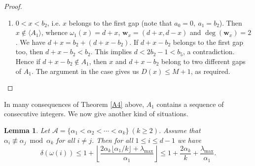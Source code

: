 \documentclass[11pt]{article}
\newtheorem{Lemma}[Theorem]{Lemma}
\def\deg{\operatorname{deg}}
\def\wbf{{\mathbf w}}
\def\Acal{{\mathcal A}}
\theoremstyle{remark}
\theoremstyle{definition}
\begin{document}
\begin{proof}
\begin{enumerate}
\begin{enumerate}[\((\text{b}1)\)]
   $$\delta_1(\wbf_x) = \delta_1(x) \leq  2+ \left\lfloor \frac{x-b}{b_2} \right\rfloor \leq  2+ \left\lfloor \frac{x-b_3-1}{b_2} \right\rfloor \leq 2+ \left\lfloor \frac{x-b_3-1}{\epsilon'} \right\rfloor.$$
   This implies
   $$D(x) \leq   \left\lceil \frac{b_4 - x}{\epsilon'} \right\rceil + \left\lfloor \frac{x-b_3 -1}{\epsilon'} \right\rfloor \leq  \left\lceil \frac{b_4-b_3 -1}{\epsilon'} \right\rceil = \left\lfloor \frac{\lambda_i}{\epsilon'} \right\rfloor \le M.$$
     \end{enumerate}
     \item $0< x< b_2$, i.e. $x$ belongs to the first gap (note that $a_0 = 0, \ a_1 = b_2$). Then $x\not\in \langle A_1\rangle$, whence $\omega_1(x) =d+x$, $\wbf_x = (d+x, d-x)$ and $\deg(\wbf_x) = 2$. We have $d+ x = b_2 + (d+x-b_2)$. If $d+x-b_2$ belongs to the first gap too, then $d+x-b_2 < b_2$. This implies $d< 2b_2 - 1< b_5$, a contradiction. Hence if $d+x-b_2\not\in A_1$, then $x$ and $d+x-b_2$ belong to two different gaps of $A_1$. The argument in the case  gives us $D(x)\leq M + 1$, as required. 
 \end{enumerate}
\end{proof}

In many consequences of Theorem \ref{A4} above, $A_1$ contains a sequence of consecutive integers. We now give another kind of situations.

\begin{Lemma} \label{A7} Let $\Acal =\{ \alpha_1< \alpha_2 < \cdots < \alpha_k\}\ (k\geq 2)$. Assume that $\alpha_i
 \not\equiv \alpha_j \bmod \alpha_k$ for all $i\neq j$. Then for all $1\leq i\leq d-1$ we have
$$\delta(\omega(i)) \leq 1+ \left\lfloor \frac{2\alpha_k \lfloor \alpha_1/k \rfloor + \lambda_{\max}}{\alpha_1} \right\rfloor  \leq 1 + \frac{2\alpha_k}{k} + \frac{\lambda_{\max}}{\alpha_1}.$$
\end{Lemma}
\end{document}
